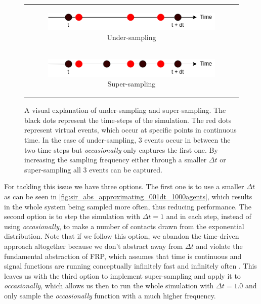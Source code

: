\begin{figure}
\begin{center}
	\begin{tabular}{c}
		\begin{subfigure}[b]{0.5\textwidth}
			\centering
			\includegraphics[width=1\textwidth, angle=0]{./fig/timedriven/undersampling.png}
			\caption{Under-sampling}
			\label{fig:undersampling}
		\end{subfigure}
		
		\\
		
		\begin{subfigure}[b]{0.5\textwidth}
			\centering
			\includegraphics[width=1\textwidth, angle=0]{./fig/timedriven/supersampling.png}
			\caption{Super-sampling}
			\label{fig:supersampling}
		\end{subfigure}
	\end{tabular}
	
	\caption{A visual explanation of under-sampling and super-sampling. The black dots represent the time-steps of the simulation. The red dots represent virtual events, which occur at specific points in continuous time. In the case of under-sampling, 3 events occur in between the two time steps but \textit{occasionally} only captures the first one. By increasing the sampling frequency either through a smaller $\Delta t$ or super-sampling all 3 events can be captured.} 
	\label{fig:sampling_issue}
\end{center}
\end{figure}

For tackling this issue we have three options. The first one is to use a smaller $\Delta t$ as can be seen in \ref{fig:sir_abs_approximating_001dt_1000agents}, which results in the whole system being sampled more often, thus reducing performance. The second option is to step the simulation with $\Delta t = 1$ and in each step, instead of using \textit{occasionally}, to make a number of contacts drawn from the exponential distribution. Note that if we follow this option, we abandon the time-driven approach altogether because we don't abstract away from $\Delta t$ and violate the fundamental abstraction of FRP, which assumes that time is continuous and signal functions are running conceptually infinitely fast and infinitely often \cite{winograd-cort_wormholes:_2012}. This leaves us with the third option to implement super-sampling and apply it to \textit{occasionally}, which allows us then to run the whole simulation with $\Delta t = 1.0$ and only sample the \textit{occasionally} function with a much higher frequency.

